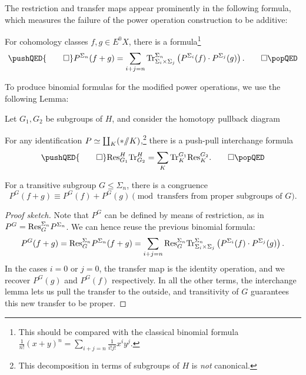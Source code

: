 The restriction and transfer maps appear prominently in the following formula, which measures the failure of the power operation construction to be additive:
\begin{lemma}
For cohomology classes \(f, g \in E^0 X\), there is a formula\footnote{This should be compared with the classical binomial formula \(\frac{1}{n!} (x + y)^n = \sum_{i+j = n} \frac{1}{i!j!} x^i y^j\).}
\[\pushQED{\qed}
P^{\Sigma_n}(f + g) = \sum_{i + j = n} \Tr_{\Sigma_i \times \Sigma_j}^{\Sigma_n}\left(P^{\Sigma_i}(f) \cdot P^{\Sigma_j}(g)\right). \qedhere
\popQED\]
\end{lemma}

\noindent To produce binomial formulas for the modified power operations, we use the following Lemma:

\begin{lemma}
Let \(G_1, G_2\) be subgroups of \(H\), and consider the homotopy pullback diagram
\begin{center}
\end{center}
For any identification \(P \simeq \coprod_K (* /\!\!/ K)\),\footnote{This decomposition in terms of subgroups of \(H\) is \emph{not} canonical.} there is a push-pull interchange formula
\[\pushQED{\qed}
\Res_{G_1}^H \Tr_{G_2}^H = \sum_K \Tr^{G_1}_K \Res_K^{G_2}. \qedhere
\popQED\]
\end{lemma}

\begin{corollary}
For a transitive subgroup \(G \le \Sigma_n\), there is a congruence \[P^G(f + g) \equiv P^G(f) + P^G(g) \pmod{\text{transfers from proper subgroups of \(G\)}}.\]
\end{corollary}
\begin{proof}[Proof sketch]
Note that \(P^G\) can be defined by means of restriction, as in \(P^G = \mathrm{Res}^{\Sigma_n}_G P^{\Sigma_n}\).  We can hence reuse the previous binomial formula: \[P^G(f + g) = \mathrm{Res}^{\Sigma_n}_G P^{\Sigma_n}(f + g) = \sum_{i+j = n} \mathrm{Res}^{\Sigma_n}_G \mathrm{Tr}_{\Sigma_i \times \Sigma_j}^{\Sigma_n}\left(P^{\Sigma_i}(f) \cdot P^{\Sigma_j}(g)\right).\]  In the cases \(i = 0\) or \(j = 0\), the transfer map is the identity operation, and we recover \(P^G(g)\) and \(P^G(f)\) respectively.  In all the other terms, the interchange lemma lets us pull the transfer to the outside, and transitivity of \(G\) guarantees this new transfer to be proper.
\end{proof}

